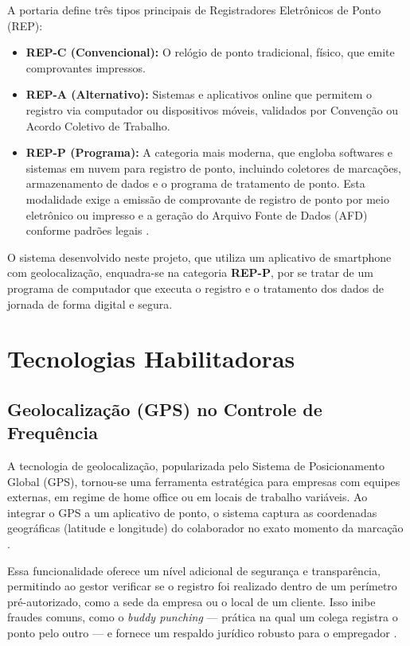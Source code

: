\par A portaria define três tipos principais de Registradores Eletrônicos de Ponto (REP):
\begin{itemize}
\item \textbf{REP-C (Convencional):} O relógio de ponto tradicional, físico, que emite comprovantes impressos.
\item \textbf{REP-A (Alternativo):} Sistemas e aplicativos online que permitem o registro via computador ou dispositivos móveis, validados por Convenção ou Acordo Coletivo de Trabalho.
\item \textbf{REP-P (Programa):} A categoria mais moderna, que engloba softwares e sistemas em nuvem para registro de ponto, incluindo coletores de marcações, armazenamento de dados e o programa de tratamento de ponto. Esta modalidade exige a emissão de comprovante de registro de ponto por meio eletrônico ou impresso e a geração do Arquivo Fonte de Dados (AFD) conforme padrões legais \cite{RequisitosREPP}.
\end{itemize}
\par O sistema desenvolvido neste projeto, que utiliza um aplicativo de smartphone com geolocalização, enquadra-se na categoria \textbf{REP-P}, por se tratar de um programa de computador que executa o registro e o tratamento dos dados de jornada de forma digital e segura.

\section{Tecnologias Habilitadoras}

\subsection{Geolocalização (GPS) no Controle de Frequência}
\par A tecnologia de geolocalização, popularizada pelo Sistema de Posicionamento Global (GPS), tornou-se uma ferramenta estratégica para empresas com equipes externas, em regime de home office ou em locais de trabalho variáveis. Ao integrar o GPS a um aplicativo de ponto, o sistema captura as coordenadas geográficas (latitude e longitude) do colaborador no exato momento da marcação \cite{GPSControlePonto}.

\par Essa funcionalidade oferece um nível adicional de segurança e transparência, permitindo ao gestor verificar se o registro foi realizado dentro de um perímetro pré-autorizado, como a sede da empresa ou o local de um cliente. Isso inibe fraudes comuns, como o \textit{buddy punching} — prática na qual um colega registra o ponto pelo outro — e fornece um respaldo jurídico robusto para o empregador \cite{GPSControlePonto}.

